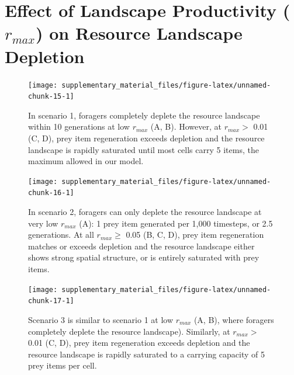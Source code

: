 \documentclass[]{article}
\begin{document}
\newpage

\hypertarget{effect-of-landscape-productivity-r_max-on-resource-landscape-depletion}{%
\section{\texorpdfstring{Effect of Landscape Productivity (\(r_{max}\)) on Resource Landscape Depletion}{Effect of Landscape Productivity (r\_\{max\}) on Resource Landscape Depletion}}\label{effect-of-landscape-productivity-r_max-on-resource-landscape-depletion}}

\begin{figure}

{\centering \texttt{[image: supplementary\_material\_files/figure-latex/unnamed-chunk-15-1]} 

}

\caption{In scenario 1, foragers completely deplete the resource landscape within 10 generations at low $r_{max}$ (A, B). However, at $r_{max} >$ 0.01 (C, D), prey item regeneration exceeds depletion and the resource landscape is rapidly saturated until most cells carry 5 items, the maximum allowed in our model.}\label{fig:unnamed-chunk-15}
\end{figure}

\begin{figure}

{\centering \texttt{[image: supplementary\_material\_files/figure-latex/unnamed-chunk-16-1]} 

}

\caption{In scenario 2, foragers can only deplete the resource landscape at very low $r_{max}$ (A): 1 prey item generated per 1,000 timesteps, or 2.5 generations. At all $r_{max} \geq$ 0.05 (B, C, D), prey item regeneration matches or exceeds depletion and the resource landscape either shows strong spatial structure, or is entirely saturated with prey items.}\label{fig:unnamed-chunk-16}
\end{figure}

\begin{figure}

{\centering \texttt{[image: supplementary\_material\_files/figure-latex/unnamed-chunk-17-1]} 

}

\caption{Scenario 3 is similar to scenario 1 at low $r_{max}$ (A, B), where foragers completely deplete the resource landscape). Similarly, at $r_{max} >$ 0.01 (C, D), prey item regeneration exceeds depletion and the resource landscape is rapidly saturated to a carrying capacity of 5 prey items per cell.}\label{fig:unnamed-chunk-17}
\end{figure}
\end{document}
